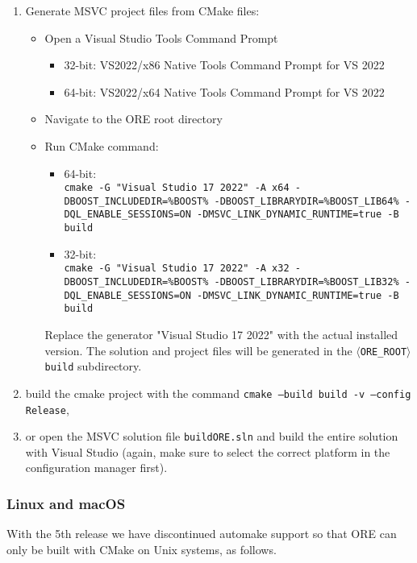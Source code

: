 \begin{enumerate}

\item Generate MSVC project files from CMake files:
\begin{itemize}
\item Open a Visual Studio Tools Command Prompt
\begin{itemize}
\item 32-bit: VS2022/x86 Native Tools Command Prompt for VS 2022
\item 64-bit: VS2022/x64 Native Tools Command Prompt for VS 2022
\end{itemize}
\item Navigate to the ORE root directory
\item Run CMake command:
\begin{itemize}
\item 64-bit: \\
{\tt cmake -G "Visual Studio 17 2022" -A x64 -DBOOST\_INCLUDEDIR=\%BOOST\% -DBOOST\_LIBRARYDIR=\%BOOST\_LIB64\% -DQL\_ENABLE\_SESSIONS=ON -DMSVC\_LINK\_DYNAMIC\_RUNTIME=true -B build}
\item 32-bit: \\
{\tt cmake -G "Visual Studio 17 2022" -A x32 -DBOOST\_INCLUDEDIR=\%BOOST\% -DBOOST\_LIBRARYDIR=\%BOOST\_LIB32\% -DQL\_ENABLE\_SESSIONS=ON -DMSVC\_LINK\_DYNAMIC\_RUNTIME=true -B build}
\end{itemize}
Replace the generator "Visual Studio 17 2022" with the actual installed version.
The solution and project files will be generated in the {\tt $\langle$ORE\_ROOT$\rangle${\bs}build} subdirectory.
\end{itemize}

\item build the cmake project with the command {\tt cmake --build build -v --config Release},

\item or open the MSVC solution file {\tt build{\bs}ORE.sln} and build the entire solution with Visual Studio (again, make sure to select the correct platform in the configuration manager first).
\end{enumerate}

\subsubsection*{Linux and macOS}

With the 5th release we have discontinued automake support so that ORE can only be built with CMake on Unix systems, as follows.

